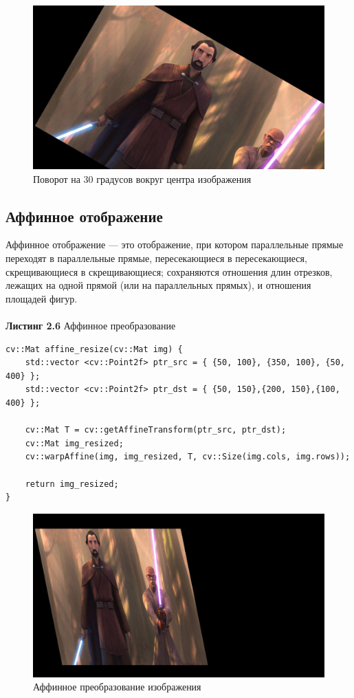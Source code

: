     \begin{figure}[h]
        \centering
        \includegraphics[scale=0.3]{"../images/results/img_center_rotation.jpg"}
        \caption{Поворот на 30 градусов вокруг центра изображения}
    \end{figure}
    \subsection{Аффинное отображение}
   \noindent Аффинное отображение — это отображение, при котором
параллельные прямые переходят в параллельные прямые, пересекающиеся в пересекающиеся, скрещивающиеся в скрещивающиеся; сохраняются отношения длин отрезков, лежащих на одной прямой (или на параллельных прямых), и отношения площадей фигур.\\
\\ \noindent \textbf{Листинг 2.6} Аффинное преобразование
\begin{lstlisting}
cv::Mat affine_resize(cv::Mat img) {
    std::vector <cv::Point2f> ptr_src = { {50, 100}, {350, 100}, {50, 400} };
    std::vector <cv::Point2f> ptr_dst = { {50, 150},{200, 150},{100, 400} };

    cv::Mat T = cv::getAffineTransform(ptr_src, ptr_dst);
    cv::Mat img_resized;
    cv::warpAffine(img, img_resized, T, cv::Size(img.cols, img.rows));

    return img_resized;
}
\end{lstlisting}
\begin{figure}[h]
    \centering
    \includegraphics[scale=0.3]{"../images/results/affine_resize.jpg"}
    \caption{Аффинное преобразование изображения}
\end{figure}
